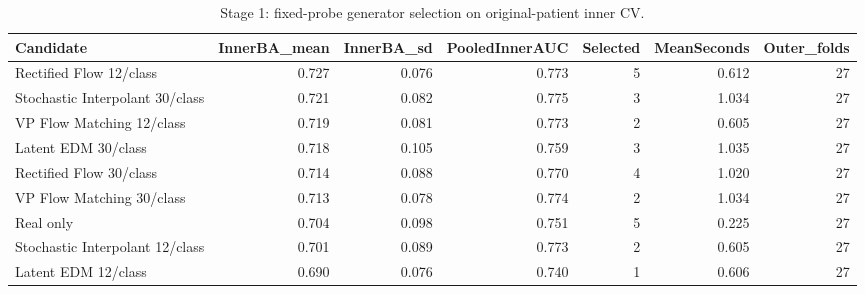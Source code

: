 \begin{table}[t]
\centering
\caption{Stage 1: fixed-probe generator selection on original-patient inner CV.}
\footnotesize
\begin{tabular}{lrrrrrr}
\toprule
Candidate & InnerBA\_mean & InnerBA\_sd & PooledInnerAUC & Selected & MeanSeconds & Outer\_folds \\
\midrule
Rectified Flow 12/class & 0.727 & 0.076 & 0.773 & 5 & 0.612 & 27 \\
Stochastic Interpolant 30/class & 0.721 & 0.082 & 0.775 & 3 & 1.034 & 27 \\
VP Flow Matching 12/class & 0.719 & 0.081 & 0.773 & 2 & 0.605 & 27 \\
Latent EDM 30/class & 0.718 & 0.105 & 0.759 & 3 & 1.035 & 27 \\
Rectified Flow 30/class & 0.714 & 0.088 & 0.770 & 4 & 1.020 & 27 \\
VP Flow Matching 30/class & 0.713 & 0.078 & 0.774 & 2 & 1.034 & 27 \\
Real only & 0.704 & 0.098 & 0.751 & 5 & 0.225 & 27 \\
Stochastic Interpolant 12/class & 0.701 & 0.089 & 0.773 & 2 & 0.605 & 27 \\
Latent EDM 12/class & 0.690 & 0.076 & 0.740 & 1 & 0.606 & 27 \\
\bottomrule
\end{tabular}
\end{table}
